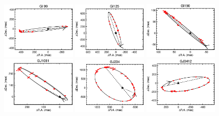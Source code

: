 \documentclass[twocolumn]{aastex62}
\begin{document}
\begin{figure}[htp]
\begin{center}
\includegraphics[width=0.32\textwidth]{Orbits/HIP11542AB.eps} %
\includegraphics[width=0.32\textwidth]{Orbits/Gl125AB.eps}
\includegraphics[width=0.32\textwidth]{Orbits/Gl190AB.eps}
\includegraphics[width=0.32\textwidth]{Orbits/GJ1081AB.eps}
\includegraphics[width=0.32\textwidth]{Orbits/GJ234AB.eps}
\includegraphics[width=0.32\textwidth]{Orbits/GJ3412AB.eps}

\end{center}
\end{figure}
\end{document}

